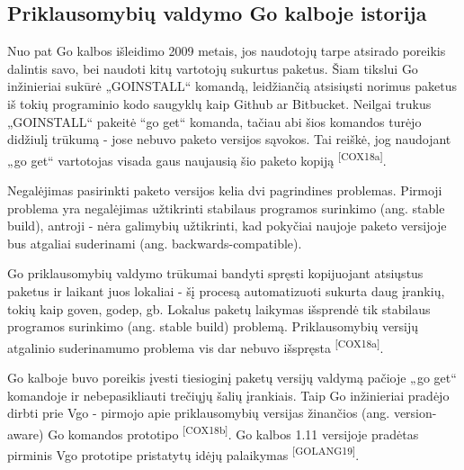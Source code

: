\subsection{Priklausomybių valdymo Go kalboje istorija}

Nuo pat Go kalbos išleidimo 2009 metais, jos naudotojų tarpe atsirado poreikis dalintis savo, bei naudoti kitų vartotojų sukurtus paketus.
Šiam tikslui Go inžinieriai sukūrė „GOINSTALL“ komandą, leidžiančią atsisiųsti norimus paketus iš tokių programinio kodo saugyklų kaip Github ar Bitbucket.
Neilgai trukus „GOINSTALL“ pakeitė “go get“ komanda, tačiau abi šios komandos turėjo didžiulį trūkumą - jose nebuvo
paketo versijos sąvokos. Tai reiškė, jog naudojant „go get“ vartotojas visada gaus naujausią šio paketo kopiją \textsuperscript{[COX18a]}.

Negalėjimas pasirinkti paketo versijos kelia dvi pagrindines problemas.
Pirmoji problema yra negalėjimas užtikrinti stabilaus programos surinkimo (ang. stable build),
antroji - nėra galimybių užtikrinti, kad pokyčiai naujoje paketo versijoje bus atgaliai suderinami (ang. backwards-compatible).

Go priklausomybių valdymo trūkumai bandyti spręsti kopijuojant atsiųstus paketus ir laikant juos lokaliai -
šį procesą automatizuoti sukurta daug įrankių, tokių kaip goven, godep, gb. Lokalus paketų laikymas
išsprendė tik stabilaus programos surinkimo (ang. stable build) problemą. Priklausomybių versijų
atgalinio suderinamumo problema vis dar nebuvo išspręsta \textsuperscript{[COX18a]}.

Go kalboje buvo poreikis įvesti tiesioginį paketų versijų valdymą pačioje „go get“ komandoje ir nebepasikliauti trečiųjų šalių
įrankiais. Taip Go inžinieriai pradėjo dirbti prie Vgo - pirmojo apie priklausomybių versijas žinančios (ang. version-aware) Go
komandos prototipo \textsuperscript{[COX18b]}. Go kalbos 1.11 versijoje pradėtas pirminis Vgo prototipe pristatytų idėjų palaikymas
\textsuperscript{[GOLANG19]}.
